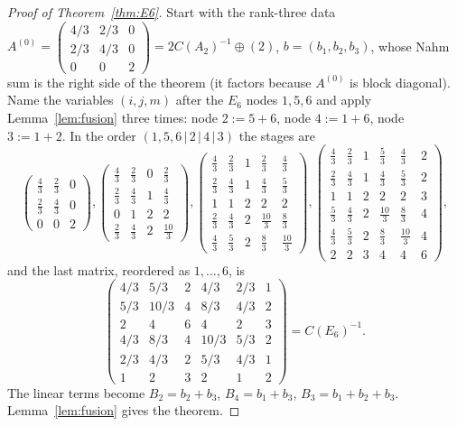 \documentclass[11pt]{amsart}
\theoremstyle{definition}
\numberwithin{equation}{section}
\begin{document}
\begin{proof}[Proof of Theorem~\ref{thm:E6}]
Start with the rank-three data
$A^{(0)}=\left(\begin{smallmatrix}4/3&2/3&0\\2/3&4/3&0\\0&0&2\end{smallmatrix}\right)=2C(A_2)^{-1}\oplus(2)$, $b=(b_1,b_2,b_3)$,
whose Nahm sum is the right side of the theorem (it factors because $A^{(0)}$ is block diagonal). Name
the variables $(i,j,m)$ after the $E_6$ nodes $1,5,6$ and apply Lemma~\ref{lem:fusion} three times:
node $2:=5+6$, node $4:=1+6$, node $3:=1+2$. In the order $(1,5,6\,|\,2\,|\,4\,|\,3)$ the stages are
\[
\begin{pmatrix}\frac43&\frac23&0\\\frac23&\frac43&0\\0&0&2\end{pmatrix}\!,
\begin{pmatrix}\frac43&\frac23&0&\frac23\\\frac23&\frac43&1&\frac43\\0&1&2&2\\\frac23&\frac43&2&\frac{10}3\end{pmatrix}\!,
\begin{pmatrix}\frac43&\frac23&1&\frac23&\frac43\\\frac23&\frac43&1&\frac43&\frac53\\1&1&2&2&2\\\frac23&\frac43&2&\frac{10}3&\frac83\\\frac43&\frac53&2&\frac83&\frac{10}3\end{pmatrix}\!,
\begin{pmatrix}\frac43&\frac23&1&\frac53&\frac43&2\\\frac23&\frac43&1&\frac43&\frac53&2\\1&1&2&2&2&3\\\frac53&\frac43&2&\frac{10}3&\frac83&4\\\frac43&\frac53&2&\frac83&\frac{10}3&4\\2&2&3&4&4&6\end{pmatrix}\!,
\]
and the last matrix, reordered as $1,\dots,6$, is
\[
\begin{pmatrix}
4/3&5/3&2&4/3&2/3&1\\5/3&10/3&4&8/3&4/3&2\\2&4&6&4&2&3\\4/3&8/3&4&10/3&5/3&2\\2/3&4/3&2&5/3&4/3&1\\1&2&3&2&1&2
\end{pmatrix}=C(E_6)^{-1}.
\]
The linear terms become $B_2=b_2+b_3$, $B_4=b_1+b_3$, $B_3=b_1+b_2+b_3$. Lemma~\ref{lem:fusion} gives the
theorem.
\end{proof}
\end{document}
